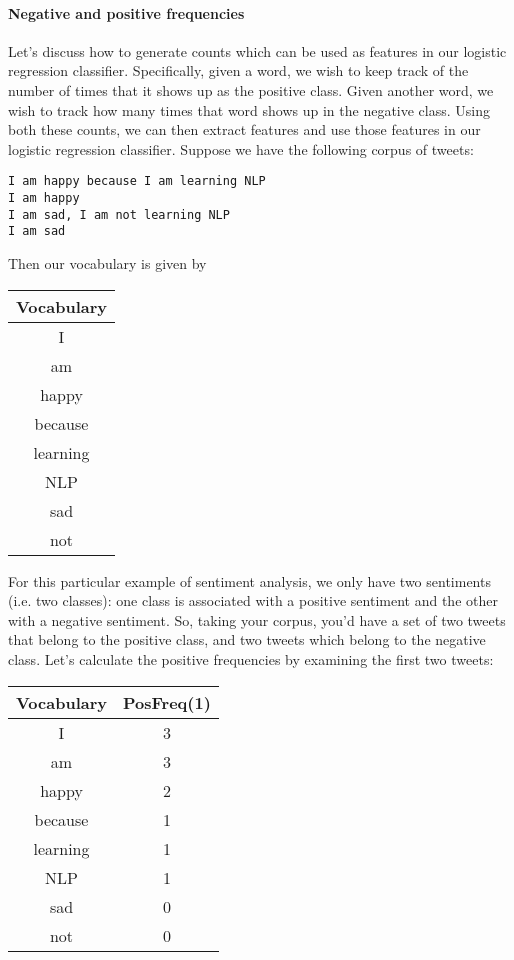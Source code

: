 \documentclass[12pt]{article}
\begin{document}
\paragraph{Negative and positive frequencies} Let's discuss how to generate counts which can be used as features in our logistic regression classifier. Specifically, given a word, we wish to keep track of the number of times that it shows up as the positive class. Given another word, we wish to track how many times that word shows up in the negative class. Using both these counts, we can then extract features and use those features in our logistic regression classifier. Suppose we have the following corpus of tweets:
\begin{verbatim}
I am happy because I am learning NLP
I am happy
I am sad, I am not learning NLP
I am sad
\end{verbatim}
Then our vocabulary is given by
\begin{center}
  \begin{tabular}{c}
    \hline
    Vocabulary \\
    \hline
    I \\
    am \\
    happy \\
    because \\
    learning \\
    NLP \\
    sad \\
    not
  \end{tabular}
\end{center}

For this particular example of sentiment analysis, we only have two sentiments (i.e. two classes): one class is associated with a positive sentiment and the other with a negative sentiment. So, taking your corpus, you'd have a set of two tweets that belong to the positive class, and two tweets which belong to the negative class. Let's calculate the positive frequencies by examining the first two tweets:

\begin{center}
  \begin{tabular}{c c}
    \hline
    Vocabulary & PosFreq(1) \\
    \hline
    I  & 3 \\
    am & 3 \\
    happy & 2 \\
    because & 1 \\
    learning & 1 \\
    NLP & 1 \\
    sad & 0 \\
    not & 0
  \end{tabular}
\end{center}
\end{document}
